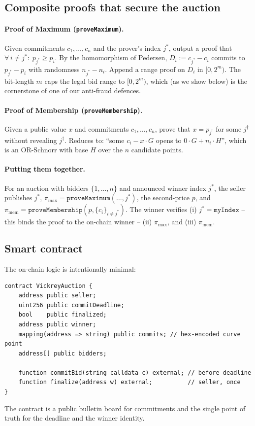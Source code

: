 \documentclass[11pt,a4paper]{article}
\begin{document}
\subsection{Composite proofs that secure the auction}

\paragraph{Proof of Maximum (\texttt{proveMaximum}).} Given commitments
$c_1,\dots,c_n$ and the prover's index $j^*$, output a proof that
$
\forall\, i\neq j^*:\; p_{j^*} \geq p_i.
$
By the homomorphism of Pedersen, $D_i := c_{j^*} - c_i$ commits to
$p_{j^*} - p_i$ with randomness $n_{j^*} - n_i$. Append a range proof on $D_i$
in $[0, 2^m)$. The bit-length $m$ caps the legal bid range to $[0, 2^m)$,
which (as we show below) is the cornerstone of one of our anti-fraud defences.

\paragraph{Proof of Membership (\texttt{proveMembership}).} Given a public
value $x$ and commitments $c_1,\dots,c_n$, prove that $x = p_{j^\dagger}$ for
some $j^\dagger$ without revealing $j^\dagger$. Reduces to: ``some $c_i - x\cdot G$
opens to $0\cdot G + n_i\cdot H$'', which is an OR-Schnorr with base $H$ over
the $n$ candidate points.

\paragraph{Putting them together.} For an auction with bidders
$\{1,\dots,n\}$ and announced winner index $j^*$, the seller publishes
$j^*$, $\pi_{\max}=\texttt{proveMaximum}(\dots,j^*)$, the second-price $p$,
and $\pi_{\mathrm{mem}}=\texttt{proveMembership}(p,\{c_i\}_{i\neq j^*})$.
The winner verifies (i) $j^* = \texttt{myIndex}$ -- this binds the proof to
the on-chain winner -- (ii) $\pi_{\max}$, and (iii) $\pi_{\mathrm{mem}}$.

\subsection{Smart contract}

The on-chain logic is intentionally minimal:
\begin{lstlisting}[language=solidity]
contract VickreyAuction {
    address public seller;
    uint256 public commitDeadline;
    bool    public finalized;
    address public winner;
    mapping(address => string) public commits; // hex-encoded curve point
    address[] public bidders;

    function commitBid(string calldata c) external; // before deadline
    function finalize(address w) external;          // seller, once
}
\end{lstlisting}
The contract is a public bulletin board for commitments and the single point
of truth for the deadline and the winner identity.
\end{document}
